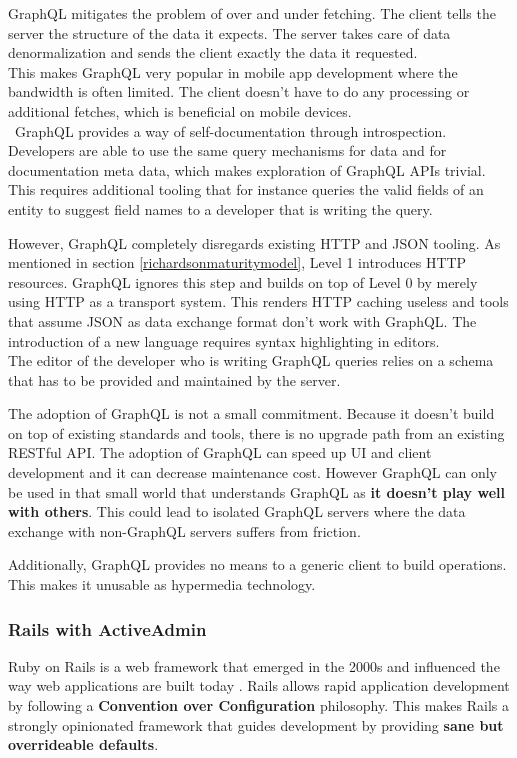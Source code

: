 GraphQL mitigates the problem of over and under fetching. The client tells the server the structure of the data it expects. The server takes care of data denormalization and sends the client exactly the data it requested. \\ This makes GraphQL very popular in mobile app development where the bandwidth is often limited. The client doesn't have to do any processing or additional fetches, which is beneficial on mobile devices. \\\
GraphQL provides a way of self-documentation through introspection. Developers are able to use the same query mechanisms for data and for documentation meta data, which makes exploration of GraphQL APIs trivial. This requires additional tooling that for instance queries the valid fields of an entity to suggest field names to a developer that is writing the query.

However, GraphQL completely disregards existing HTTP and JSON tooling. As mentioned in section \ref{richardsonmaturitymodel}, Level 1 introduces HTTP resources. GraphQL ignores this step and builds on top of Level 0 by merely using HTTP as a transport system. This renders HTTP caching useless and tools that assume JSON as data exchange format don't work with GraphQL. The introduction of a new language requires syntax highlighting in editors. \\
The editor of the developer who is writing GraphQL queries relies on a schema that has to be provided and maintained by the server.

The adoption of GraphQL is not a small commitment. Because it doesn't build on top of existing standards and tools, there is no upgrade path from an existing RESTful API. The adoption of GraphQL can speed up UI and client development and it can decrease maintenance cost. However GraphQL can only be used in that small world that understands GraphQL as \textbf{it doesn't play well with others}. This could lead to isolated GraphQL servers where the data exchange with non-GraphQL servers suffers from friction.

Additionally, GraphQL provides no means to a generic client to build operations. This makes it unusable as hypermedia technology.

\subsubsection{Rails with ActiveAdmin}
Ruby on Rails is a web framework that emerged in the 2000s and influenced the way web applications are built today \citep{rubyonrails}. Rails allows rapid application development by following a \textbf{Convention over Configuration} philosophy. This makes Rails a strongly opinionated framework that guides development by providing \textbf{sane but overrideable defaults}.

